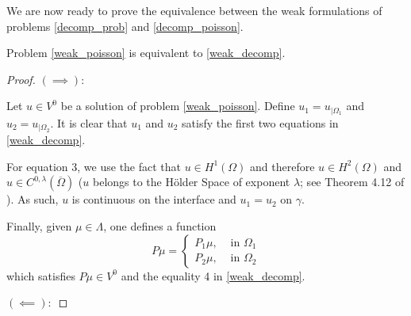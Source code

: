 We are now ready to prove the equivalence between the weak formulations of problems \eqref{decomp_prob} and \eqref{decomp_poisson}.
\begin{theorem}\label{equivalence_transmission}
    Problem \eqref{weak_poisson} is equivalent to \eqref{weak_decomp}.
\end{theorem}
\begin{proof}
    \((\implies):\)

    Let \(u \in V^0\) be a solution of problem \eqref{weak_poisson}. Define \(u_1 = u_{|\Omega_1}\) and \(u_2 = u_{|\Omega_2}\). It is clear that \(u_1\) and \(u_2\) satisfy the first two equations in \eqref{weak_decomp}. 
    
    For equation 3, we use the fact that \(u \in H^1(\Omega)\) and therefore \(u \in H^2(\Omega)\) and \(u \in C^{0,\lambda}(\overline{\Omega})\) (\(u\) belongs to the H\"{o}lder Space of exponent \(\lambda\); see Theorem 4.12 of \cite{adams2003sobolev}). As such, \(u\) is continuous on the interface and \(u_1=u_2\) on \(\gamma\).

    Finally, given \(\mu \in \Lambda\), one defines a function
    \[
        P \mu =
    \begin{cases}
        P_1 \mu, & \text{ in } \Omega_1\\
        P_2 \mu, & \text{ in } \Omega_2
    \end{cases}
    \]
    which satisfies \(P \mu \in V^0\) and the equality 4 in \eqref{weak_decomp}.

    \vspace*{0.5cm}
    \((\impliedby):\)


\end{proof}
